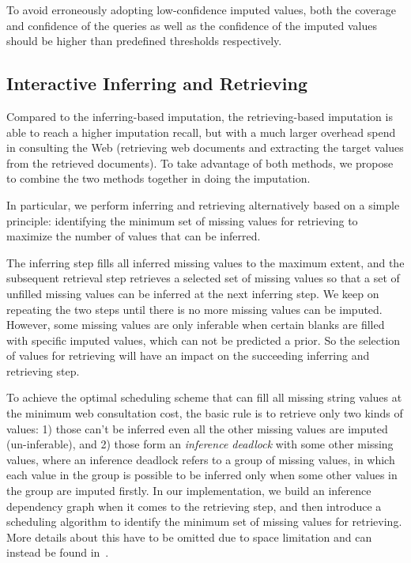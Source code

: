 \documentclass[sigconf]{acmart}
\begin{document}
To avoid erroneously adopting low-confidence imputed values, both the coverage and confidence of the queries as well as the confidence of the imputed values should be higher than predefined thresholds respectively.
\subsection{Interactive Inferring and Retrieving}
Compared to the inferring-based imputation, the retrieving-based imputation is able to reach a higher imputation recall, but with a much larger overhead spend in consulting the Web (retrieving web documents and extracting the target values from the retrieved documents).
%
To take advantage of both methods, we propose to combine the two methods together in doing the imputation.

In particular, we perform inferring and retrieving alternatively based on a simple principle: identifying the minimum set of missing values for retrieving to maximize the number of values that can be inferred.

{\color{red}The inferring step fills all inferred missing values to the maximum extent, and the subsequent retrieval step retrieves a selected set of missing values so that a set of unfilled missing values can be inferred at the next inferring step. We keep on repeating the two steps until there is no more missing values can be imputed.}
%
However, some missing values are only inferable when certain blanks are filled with specific imputed values, which can not be predicted a prior. So the selection of values for retrieving will have an impact on the succeeding inferring and retrieving step.

To achieve the optimal scheduling scheme {\color{red}that can fill all missing string values at the minimum web consultation cost}, the basic rule is to retrieve only two kinds of values: 1) those can't be inferred even all the other missing values are imputed (un-inferable), and 2) those form an {\em inference deadlock} with some other missing values, where an inference deadlock refers to a group of missing values, in which each value in the group is possible to be inferred only when some other values in the group are imputed firstly.
%
In our implementation, we build an inference dependency graph when it comes to the retrieving step, and then introduce a scheduling algorithm to identify the minimum set of missing values for retrieving. More details about this have to be omitted due to space limitation and can instead be found in~\cite{li2015trip}.
\end{document}
